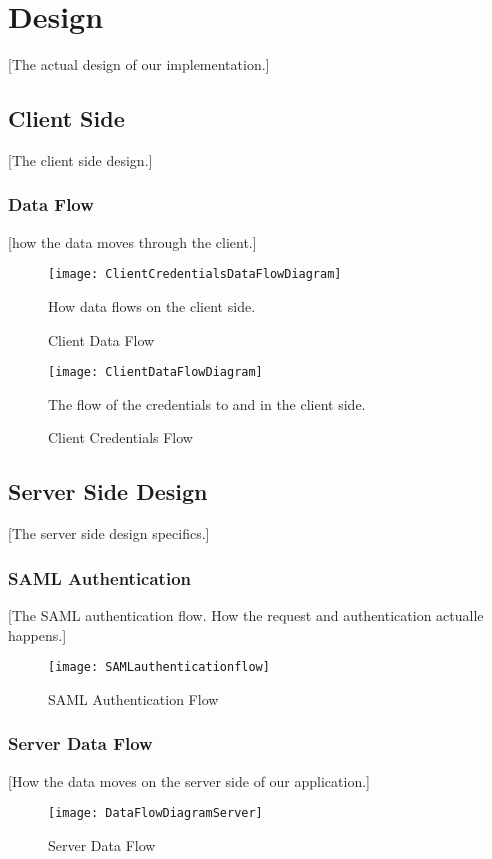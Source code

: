 \section{Design}\label{Design}
    [The actual design of our implementation.]
    \subsection{Client Side}\label{Client Side}
        [The client side design.]
        \subsubsection{Data Flow}\label{Data Flow}
        [how the data moves through the client.]
            \begin{figure}[h]
            \centering
            \texttt{[image: ClientCredentialsDataFlowDiagram]}
            \caption{Client Data Flow}
            How data flows on the client side.
            \label{fig:ClientCredentialsDataFlowDiagram}
        \end{figure}
        
        \begin{figure}[h]
            \centering
            \texttt{[image: ClientDataFlowDiagram]}
            \caption{Client Credentials Flow}
            The flow of the credentials to and in the client side.
            \label{fig:ClientDataFlowDiagram}
        \end{figure}
        
    \subsection{Server Side Design}\label{Server Side Design}
        [The server side design specifics.]
        \subsubsection{SAML Authentication}\label{SAML Authentication}
            [The SAML authentication flow. How the request and authentication actualle happens.]
            \begin{figure}[h]
                \centering
                \texttt{[image: SAMLauthenticationflow]}
                \caption{SAML Authentication Flow}
                \label{fig:SAMLauthenticationflow}
            \end{figure}
        
        \subsubsection{Server Data Flow}\label{Server Data Flow}
            [How the data moves on the server side of our application.]
            \begin{figure}[h]
                \centering
                \texttt{[image: DataFlowDiagramServer]}
                \caption{Server Data Flow}
                \label{fig:DataFlowDiagramServer}
            \end{figure}

